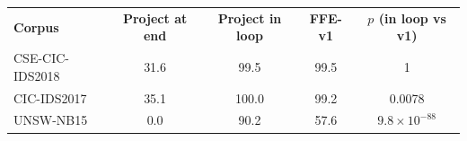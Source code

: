 \begin{tabular}{@{}lcccc@{}}
\toprule
\textbf{Corpus} & \textbf{Project at end} & \textbf{Project in loop} & \textbf{FFE-v1} & \textbf{$p$ (in loop vs v1)} \\
CSE-CIC-IDS2018 & 31.6 & 99.5 & 99.5 & 1 \\
CIC-IDS2017 & 35.1 & 100.0 & 99.2 & 0.0078 \\
UNSW-NB15 & 0.0 & 90.2 & 57.6 & $9.8\times10^{-88}$ \\
\bottomrule
\end{tabular}
